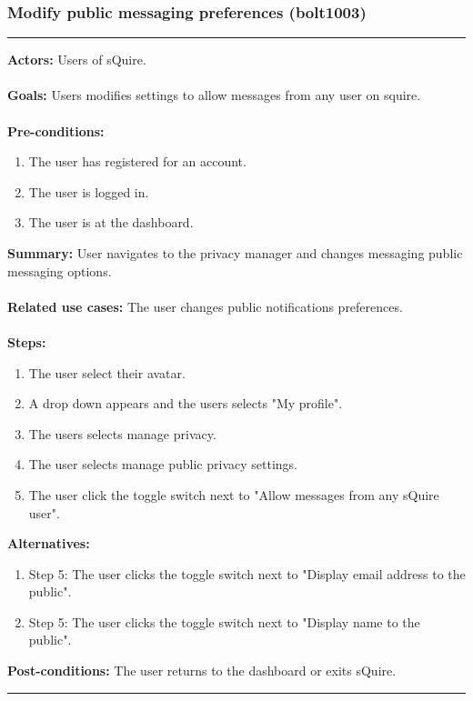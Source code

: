\documentclass[11pt]{report}
\begin{document}
\subsubsection{Modify public messaging preferences (bolt1003)}
\vspace{2pt}
\hrule
\vspace{8pt}
 \textbf{Actors:} Users of sQuire. \\ \\
\textbf{Goals:} Users modifies settings to allow messages from any user on squire. \\ \\
 \textbf{Pre-conditions:} \begin{enumerate}
  \item The user has registered for an account.
  \item The user is logged in.
  \item The user is at the dashboard.
 \end{enumerate}
 \textbf{Summary:} User navigates to the privacy manager and changes messaging public messaging options.\\ \\
\textbf{Related use cases:} The user changes public notifications preferences. \\ \\
\textbf{Steps:} \begin{enumerate}
  \item The user select their avatar.
  \item A drop down appears and the users selects "My profile".
  \item The users selects manage privacy.
  \item The user selects manage public privacy settings.
  \item The user click the toggle switch next to "Allow messages from any sQuire user".
 \end{enumerate}
 \textbf{Alternatives:} \begin{enumerate} 
  \item Step 5: The user clicks the toggle switch next to "Display email address to the public".
  \item Step 5: The user clicks the toggle switch next to "Display name to the public".
 \end{enumerate}
 \textbf{Post-conditions:} The user returns to the dashboard or exits sQuire. \\
\vspace{8pt}
\hrule
\newpage
\end{document}
